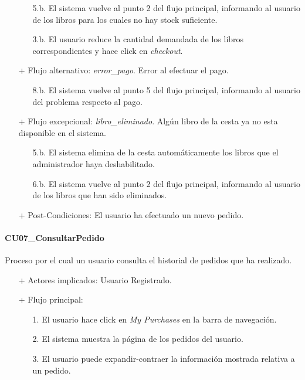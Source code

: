 \documentclass[a4paper]{article}
\begin{document}
\begin{itemize}
\begin{itemize}
                        \item[5.b.] El sistema vuelve al punto 2 del flujo principal, informando al usuario de los libros para los cuales no hay stock suficiente.
                        \item[3.b.] El usuario reduce la cantidad demandada de los libros correspondientes y hace click en \emph{checkout}.
                    \end{itemize}
                    \item[+] Flujo alternativo: \emph{error\_pago}. Error al efectuar el pago.
                    \begin{itemize}
                        \item[8.b.] El sistema vuelve al punto 5 del flujo principal, informando al usuario del problema respecto al pago.
                    \end{itemize}
                    \item[+] Flujo excepcional: \emph{libro\_eliminado}. Algún libro de la cesta ya no esta disponible en el sistema.
                    \begin{itemize}
                        \item[5.b.] El sistema elimina de la cesta automáticamente los libros que el administrador haya deshabilitado.
                        \item[6.b.] El sistema vuelve al punto 2 del flujo principal, informando al usuario de los libros que han sido eliminados.
                    \end{itemize}
                    \item[+] Post-Condiciones: El usuario ha efectuado un nuevo pedido.
                \end{itemize}

            \paragraph{CU07\_ConsultarPedido}
                Proceso por el cual un usuario consulta el historial de pedidos que ha realizado.
                \begin{itemize}
                    \item[+] Actores implicados: Usuario Registrado.
                    \item[+] Flujo principal:
                    \begin{enumerate}
                        \item[1.] El usuario hace click en \emph{My Purchases} en la barra de navegación.
                        \item[2.] El sistema muestra la página de los pedidos del usuario.
                        \item[3.] El usuario puede expandir-contraer la información mostrada relativa a un pedido.
                    \end{enumerate}
                \end{itemize}
\end{document}

